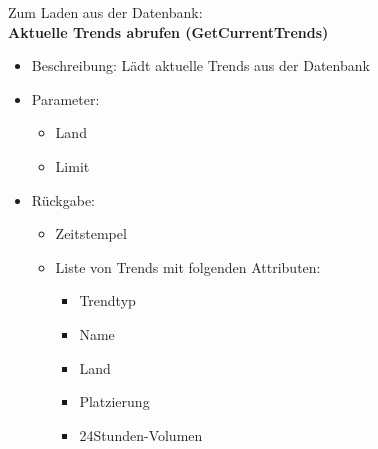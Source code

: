 \documentclass[conference]{IEEEtran}
\begin{document}
Zum Laden aus der Datenbank:
\\
\smallskip
\textbf{Aktuelle Trends abrufen (GetCurrentTrends)}
\begin{itemize}
    \item Beschreibung: Lädt aktuelle Trends aus der Datenbank
    \item Parameter:
          \begin{itemize}
              \item Land
              \item Limit
          \end{itemize}
    \item Rückgabe:
          \begin{itemize}
              \item Zeitstempel
              \item Liste von Trends mit folgenden Attributen:
                    \begin{itemize}
                        \item Trendtyp
                        \item Name
                        \item Land
                        \item Platzierung
                        \item 24Stunden-Volumen
                    \end{itemize}
          \end{itemize}
\end{itemize}
\end{document}
